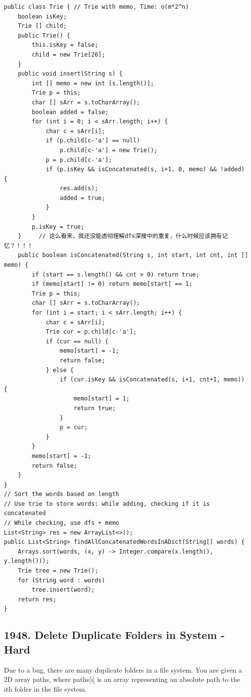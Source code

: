 \documentclass[9pt, b5paaper]{book}
\begin{document}
\begin{verbatim}
public class Trie { // Trie with memo, Time: o(m*2^n)
    boolean isKey;
    Trie [] child;
    public Trie() {
        this.isKey = false;
        child = new Trie[26];
    }
    public void insert(String s) {
        int [] memo = new int [s.length()];
        Trie p = this;
        char [] sArr = s.toCharArray();
        boolean added = false;
        for (int i = 0; i < sArr.length; i++) {
            char c = sArr[i];
            if (p.child[c-'a'] == null)
                p.child[c-'a'] = new Trie();
            p = p.child[c-'a'];
            if (p.isKey && isConcatenated(s, i+1, 0, memo) && !added) {
                res.add(s);
                added = true;
            }
        }
        p.isKey = true;
    }     // 这么看来，我还没能透彻理解dfs深搜中的重复，什么时候应该拥有记忆？！！！
    public boolean isConcatenated(String s, int start, int cnt, int [] memo) {
        if (start == s.length() && cnt > 0) return true; 
        if (memo[start] != 0) return memo[start] == 1;
        Trie p = this;
        char [] sArr = s.toCharArray();
        for (int i = start; i < sArr.length; i++) {
            char c = sArr[i];
            Trie cur = p.child[c-'a'];
            if (cur == null) {
                memo[start] = -1;
                return false;
            } else {
                if (cur.isKey && isConcatenated(s, i+1, cnt+1, memo)) {
                    memo[start] = 1;
                    return true;
                }
                p = cur;
            }
        }
        memo[start] = -1;
        return false;
    }
}
// Sort the words based on length
// Use trie to store words: while adding, checking if it is concatenated
// While checking, use dfs + memo
List<String> res = new ArrayList<>();
public List<String> findAllConcatenatedWordsInADict(String[] words) {
    Arrays.sort(words, (x, y) -> Integer.compare(x.length(), y.length()));
    Trie tree = new Trie();
    for (String word : words) 
        tree.insert(word);
    return res;
}
\end{verbatim}

\subsection{1948. Delete Duplicate Folders in System - Hard}
\label{sec-2-1-10}
Due to a bug, there are many duplicate folders in a file system. You are given a 2D array paths, where paths[i] is an array representing an absolute path to the ith folder in the file system.
\end{document}
